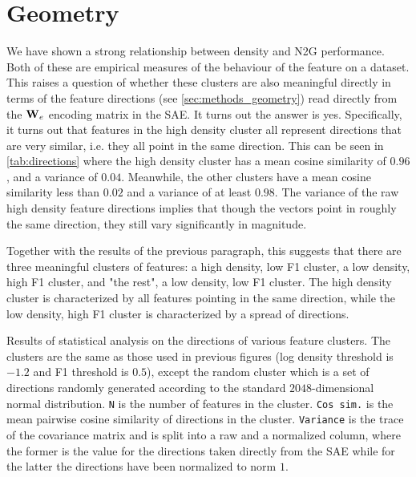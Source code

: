 \section{Geometry}
We have shown a strong relationship between density and \ac{N2G} performance.
Both of these are empirical measures of the behaviour of the feature on a dataset.
This raises a question of whether these clusters are also meaningful directly in terms of the feature directions (see \autoref{sec:methods_geometry}) read directly from the $\mathbf{W}_e$ encoding matrix in the SAE.
It turns out the answer is yes.
Specifically, it turns out that features in the high density cluster all represent directions that are very similar, i.e. they all point in the same direction.
This can be seen in \autoref{tab:directions} where the high density cluster has a mean cosine similarity of $0.96$, and a variance of $0.04$.
Meanwhile, the other clusters have a mean cosine similarity less than $0.02$ and a variance of at least $0.98$.
The variance of the raw high density feature directions implies that though the vectors point in roughly the same direction, they still vary significantly in magnitude.

Together with the results of the previous paragraph, this suggests that there are three meaningful clusters of features: a high density, low F1 cluster, a low density, high F1 cluster, and "the rest", a low density, low F1 cluster.
The high density cluster is characterized by all features pointing in the same direction, while the low density, high F1 cluster is characterized by a spread of directions.

\begin{table}[ht]
    \centering
    
    \caption{Results of statistical analysis on the directions of various feature clusters.
    The clusters are the same as those used in previous figures (log density threshold is $-1.2$ and F1 threshold is $0.5$), except the random cluster which is a set of directions randomly generated according to the standard $2048$-dimensional normal distribution.
    \texttt N is the number of features in the cluster.
    \texttt{Cos sim.} is the mean pairwise cosine similarity of directions in the cluster.
    \texttt{Variance} is the trace of the covariance matrix and is split into a raw and a normalized column, where the former is the value for the directions taken directly from the \ac{SAE} while for the latter the directions have been normalized to norm $1$.
    }
    \label{tab:directions}
\end{table}

